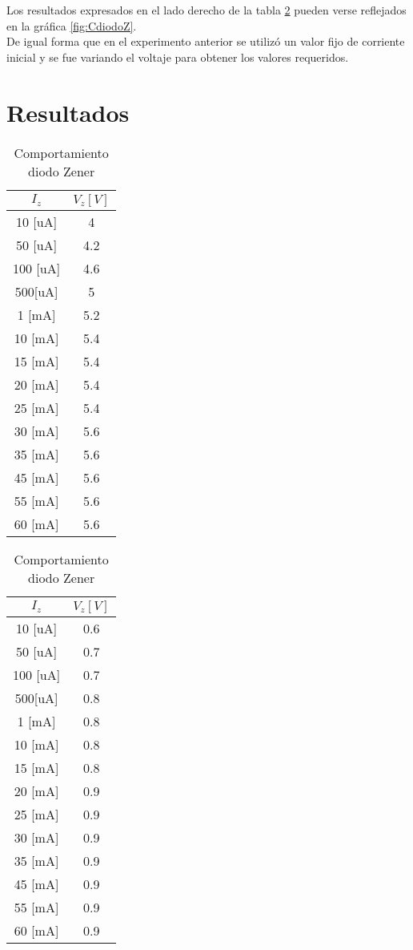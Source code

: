 \documentclass{article}
\begin{document}
Los resultados expresados en el lado derecho de la tabla \ref{zenerI} pueden verse reflejados en la gráfica \ref{fig:CdiodoZ}.\\

De igual forma que en el experimento anterior se utilizó un valor fijo de corriente inicial y se fue variando el voltaje para obtener los valores requeridos.\\

\section{Resultados}



\begin{table}[h!]
\centering
\begin{tabular}{|c|c|}
\hline
$I_z$           & $V_z [V]$  \\ \hline
10 {[}uA{]}  & 4   \\ \hline
50 {[}uA{]}  & 4.2 \\ \hline
100 {[}uA{]} & 4.6 \\ \hline
500{[}uA{]}  & 5   \\ \hline
1 {[}mA{]}   & 5.2 \\ \hline
10 {[}mA{]}  & 5.4 \\ \hline
15 {[}mA{]}  & 5.4 \\ \hline
20 {[}mA{]}  & 5.4 \\ \hline
25 {[}mA{]}  & 5.4 \\ \hline
30 {[}mA{]}  & 5.6 \\ \hline
35 {[}mA{]}  & 5.6 \\ \hline
45 {[}mA{]}  & 5.6 \\ \hline
55 {[}mA{]}  & 5.6 \\ \hline
60 {[}mA{]}  & 5.6 \\ \hline
\end{tabular}
\begin{tabular}{|c|c|}
\hline
$I_z$           & $V_z [V]$  \\ \hline
10 {[}uA{]}  & 0.6 \\ \hline
50 {[}uA{]}  & 0.7 \\ \hline
100 {[}uA{]} & 0.7 \\ \hline
500{[}uA{]}  & 0.8 \\ \hline
1 {[}mA{]}   & 0.8 \\ \hline
10 {[}mA{]}  & 0.8 \\ \hline
15 {[}mA{]}  & 0.8 \\ \hline
20 {[}mA{]}  & 0.9 \\ \hline
25 {[}mA{]}  & 0.9 \\ \hline
30 {[}mA{]}  & 0.9 \\ \hline
35 {[}mA{]}  & 0.9 \\ \hline
45 {[}mA{]}  & 0.9 \\ \hline
55 {[}mA{]}  & 0.9 \\ \hline
60 {[}mA{]}  & 0.9 \\ \hline
\end{tabular}

\caption{Comportamiento diodo Zener}
\label{zenerI}
\end{table}
\end{document}
